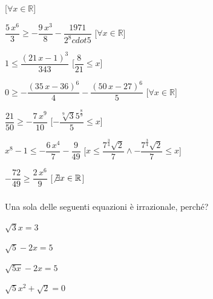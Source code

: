 \begin{esercizio}
\begin{enumeratea}
\hfill [\(\forall x \in \mathbb{R}\)]
\item \({\dfrac{5\,{x}^{6}}{3}}\geq -{\dfrac{9\,{x}^{3}}{8}}-{\dfrac
{1971}{2^8  cdot 5}}\) 
\hfill [\(\forall x \in \mathbb{R}\)]
\item \(1\leq {\dfrac{ \left( 21\,x-1 \right) ^{3}}{343}}\) 
\hfill [\({\dfrac{8}{21}}\leq x\)]
\item \(0\geq -{\dfrac{ \left( 35\,x-36 \right) ^{6}}{4}}-{\dfrac{ 
\left( 50\,x-27 \right) ^{6}}{5}}\) 
\hfill [\(\forall x \in \mathbb{R}\)]
\item \({\dfrac{21}{50}}\geq -{\dfrac{7\,{x}^{9}}{10}}\) 
\hfill [\(-{\dfrac{\sqrt [9]{3}{5}^{{\frac{8}{9}}}}{5}}\leq x\)]
\item \({x}^{8}-1\leq -{\dfrac{6\,{x}^{4}}{7}}-{\dfrac{9}{49}}\) 
\hfill [\(x\leq {\dfrac{{7}^{{\frac{3}{4}}}\sqrt {2}}{7}} \wedge -{\dfrac
{{7}^{{\frac{3}{4}}}\sqrt {2}}{7}}\leq x\)]
\item \(-{\dfrac{72}{49}}\geq {\dfrac{2\,{x}^{6}}{9}}\) 
\hfill [\(\not\exists x \in \mathbb{R}\)]
\end{enumeratea}
\end{esercizio}


\subsubsection*{}


\begin{esercizio}\label{ese:03.1}
Una sola delle seguenti equazioni è irrazionale, perché?
\begin{multicols}{4}
\begin{enumeratea}
\item \(\sqrt{3} x = 3\)
\item \(\sqrt{5} -2x = 5\)
\item \(\sqrt{5x} -2x = 5\)
\item \(\sqrt{5}x^2 +\sqrt{2} = 0\)
\end{enumeratea}
\end{multicols}
\end{esercizio}

